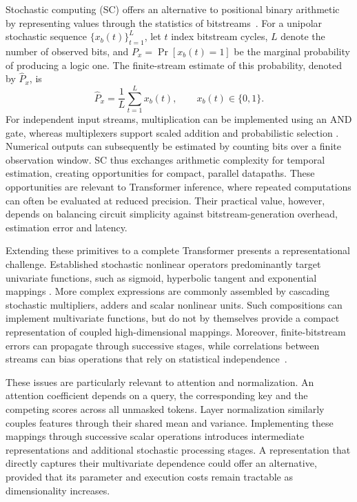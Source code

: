 \documentclass[pdflatex,sn-mathphys-num]{sn-jnl}
\theoremstyle{thmstyleone}
\theoremstyle{thmstyletwo}
\theoremstyle{thmstylethree}
\begin{document}
Stochastic computing (SC) offers an alternative to positional binary arithmetic by representing values through the statistics of bitstreams~\cite{gaines1969stochastic,alaghi2013survey}. For a unipolar stochastic sequence $\{x_b(t)\}_{t=1}^{L}$, let $t$ index bitstream cycles, $L$ denote the number of observed bits, and $P_x=\Pr[x_b(t)=1]$ be the marginal probability of producing a logic one. The finite-stream estimate of this probability, denoted by $\widehat{P}_x$, is
\begin{equation}
\widehat{P}_x = \frac{1}{L} \sum_{t=1}^{L}x_b(t), \qquad x_b(t)\in\{0,1\}. \label{eq:stochastic_encoding}
\end{equation}
For independent input streams, multiplication can be implemented using an AND gate, whereas multiplexers support scaled addition and probabilistic selection \cite{gaines1969stochastic,qian2008synthesis}. Numerical outputs can subsequently be estimated by counting bits over a finite observation window. SC thus exchanges arithmetic complexity for temporal estimation, creating opportunities for compact, parallel datapaths. These opportunities are relevant to Transformer inference, where repeated computations can often be evaluated at reduced precision. Their practical value, however, depends on balancing circuit simplicity against bitstream-generation overhead, estimation error and latency.

Extending these primitives to a complete Transformer presents a representational challenge. Established stochastic nonlinear operators predominantly target univariate functions, such as sigmoid, hyperbolic tangent and exponential mappings \cite{brown2001stochastic,feng2022mmfsm}. More complex expressions are commonly assembled by cascading stochastic multipliers, adders and scalar nonlinear units. Such compositions can implement multivariate functions, but do not by themselves provide a compact representation of coupled high-dimensional mappings. Moreover, finite-bitstream errors can propagate through successive stages, while correlations between streams can bias operations that rely on statistical independence~\cite{alaghi2013survey,alaghi2013correlation}.

These issues are particularly relevant to attention and normalization. An attention coefficient depends on a query, the corresponding key and the competing scores across all unmasked tokens. Layer normalization similarly couples features through their shared mean and variance. Implementing these mappings through successive scalar operations introduces intermediate representations and additional stochastic processing stages. A representation that directly captures their multivariate dependence could offer an alternative, provided that its parameter and execution costs remain tractable as dimensionality increases.
\end{document}
